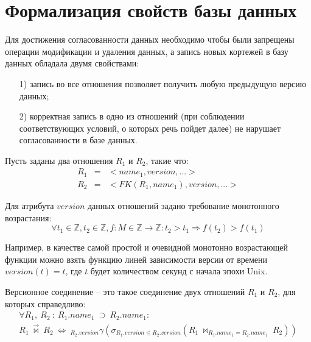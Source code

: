 \section{Формализация свойств базы данных}\label{sec:theorem}
\indent Для достижения согласованности данных необходимо чтобы были запрещены операции модификации и удаления данных, а запись новых кортежей в базу данных обладала двумя свойствами:
\begin{enumerate}
	\item[1)] запись во все отношения позволяет получить любую предыдущую версию данных;
	\item[2)] корректная запись в одно из отношений (при соблюдении соответствующих условий, о которых речь пойдет далее) не нарушает согласованности в базе данных.
\end{enumerate}

\indent Пусть заданы два отношения $R_1$ и $R_2$, такие что:
\begin{eqnarray*}
	R_1 & = & <name_1, version, ...> \\
	R_2 & = & <FK(R_1, name_1), version, ...>
\end{eqnarray*}

\indent Для атрибута $version$ данных отношений задано требование монотонного возрастания:
\begin{equation}
	\forall t_1 \in \mathbb{Z}, t_2 \in \mathbb{Z}, f: M \in \mathbb{Z} \rightarrow \mathbb{Z} : t_2 > t_1 \Rightarrow f(t_2) > f(t_1)
\end{equation}

\indent Например, в качестве самой простой и очевидной монотонно возрастающей функции можно взять функцию линей зависимости версии от времени $version(t) = t$, где $t$ будет количеством секунд с начала эпохи Unix.


\begin{definition}
	\label{def:join}
	Версионное соединение -- это такое соединение двух отношений $R_1$ и $R_2$, для которых справедливо:%
	\begin{multline}
		\label{eq:versJoin}
		\forall R_1,\ R_2\ :\ R_1.name_1\ \supset\ R_2.name_1:\\
		R_1\ \overrightarrow{\bowtie}\ R_2\ \Leftrightarrow\ _{R_2.version}\gamma(\sigma_{R_1.version \leq R_2.version}(R_1\ \bowtie_{R_1.name_1 = R_2.name_1}\ R_2))
	\end{multline}
\end{definition}

